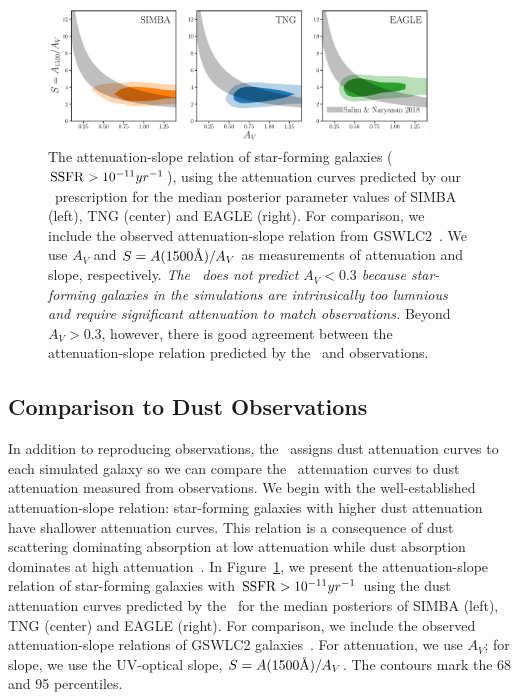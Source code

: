 \begin{figure}
\begin{center}
    \includegraphics[width=0.9\textwidth]{figs/abc_slope_AV_starforming.pdf}
    \caption{\label{fig:slope}
    The attenuation-slope relation of star-forming galaxies (${\rm SSFR} >
    10^{-11}yr^{-1}$), using the attenuation curves predicted by our  
    \eda~prescription for the median posterior parameter values of SIMBA
    (left), TNG (center) and EAGLE (right). 
    For comparison, we include the observed attenuation-slope relation
    from GSWLC2~\citep{salim2020}. 
    We use $A_V$ and $S = A(1500\AA)/A_V$ as measurements of attenuation and
    slope, respectively. 
    \emph{The \eda~does not predict $A_V < 0.3$ because star-forming galaxies in
    the simulations are intrinsically too lumnious and require significant attenuation to
    match observations.}
    Beyond $A_V > 0.3$, however, there is good agreement between the
    attenuation-slope relation predicted by the \eda~and observations. 
    }
\end{center}
\end{figure}

\subsection{Comparison to Dust Observations} \label{sec:reproduce}
In addition to  reproducing observations, the \eda~assigns dust attenuation
curves to each simulated galaxy so we can compare the \eda~attenuation curves
to dust attenuation measured from observations. 
We begin with the well-established attenuation-slope relation: star-forming
galaxies with higher dust attenuation have shallower attenuation curves. 
This relation is a consequence of dust scattering dominating absorption at
low attenuation while dust absorption dominates at high
attenuation~\citep{gordon1994, witt2000, draine2003, chevallard2013}. 
In Figure~\ref{fig:slope}, we present the attenuation-slope relation of
star-forming galaxies with ${\rm SSFR} > 10^{-11}yr^{-1}$ using the
dust attenuation curves predicted by the \eda~for the median posteriors of
SIMBA (left), TNG (center) and EAGLE (right).
For comparison, we include the observed attenuation-slope relations of
GSWLC2 galaxies~\citep[grey shaded;][]{salim2020}.
For attenuation, we use $A_V$; for slope, we use the UV-optical slope, $S
= A(1500\AA)/A_V$. 
The contours mark the 68 and 95 percentiles. 


